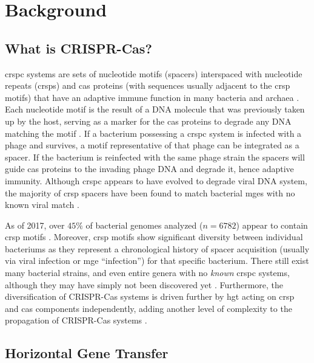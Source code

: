 \section{Background}
\subsection{What is CRISPR-Cas?}
\ac{crspc} systems are sets of nucleotide motifs (spacers) interspaced with nucleotide repeats (\ac{crsp}s) and \ac{cas} proteins (with sequences usually adjacent to the \ac{crsp} motifs) that have an adaptive immune function in many bacteria and archaea \citep{crispgen}.
Each nucleotide motif is the result of a DNA molecule that was previously taken up by the host, serving as a marker for the \ac{cas} proteins to degrade any DNA matching the motif \citep{crispgen}.
If a bacterium possessing a \ac{crspc} system is infected with a phage and survives, a motif representative of that phage can be integrated as a spacer.
If the bacterium is reinfected with the same phage strain the spacers will guide \ac{cas} proteins to the invading phage DNA and degrade it, hence adaptive immunity.
Although \ac{crspc} appears to have evolved to degrade viral DNA system, the majority of \ac{crsp} spacers have been found to match bacterial \ac{mge}s with no known viral match \citep{nonvspacer}.\par
As of 2017, over $45\%$ of bacterial genomes analyzed ($n=6782$) appear to contain \ac{crsp} motifs \citep{crispdb}.
Moreover, \ac{crsp} motifs show significant diversity between individual bacteriums as they represent a chronological history of spacer acquisition (usually via viral infection or \ac{mge} ``infection'') for that specific bacterium\citep{crispgen}.
There still exist many bacterial strains, and even entire genera with no \textit{known} \ac{crspc} systems, although they may have simply not been discovered yet \citep{ineqcas,casguild}.
Furthermore, the diversification of CRISPR-Cas systems is driven further by \ac{hgt} acting on \ac{crsp} and \ac{cas} components independently, adding another level of complexity to the propagation of CRISPR-Cas systems \citep{crispgen}.

\subsection{Horizontal Gene Transfer}
